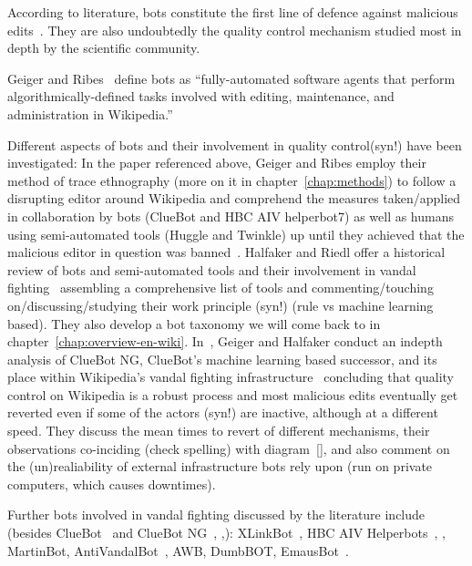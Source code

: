 According to literature, bots constitute the first line of defence against malicious edits~\cite{GeiHal2013}. %
They are also undoubtedly the quality control mechanism studied most in depth by the scientific community.

Geiger and Ribes~\cite{GeiRib2010} define bots as
``fully-automated software
agents that perform algorithmically-defined tasks involved
with editing, maintenance, and administration in Wikipedia.''

Different aspects of bots and their involvement in quality control(syn!) have been investigated:
In the paper referenced above, Geiger and Ribes employ their method of trace ethnography (more on it in chapter~\ref{chap:methods}) to follow a disrupting editor around Wikipedia and comprehend the measures taken/applied in collaboration by bots (ClueBot and HBC AIV helperbot7) as well as humans using semi-automated tools (Huggle and Twinkle) up until they achieved that the malicious editor in question was banned~\cite{GeiRib2010}.
Halfaker and Riedl offer a historical review of bots and semi-automated tools and their involvement in vandal fighting~\cite{HalRied2012} assembling a comprehensive list of tools and commenting/touching on/discussing/studying their work principle (syn!) (rule vs machine learning based).
They also develop a bot taxonomy we will come back to in chapter~\ref{chap:overview-en-wiki}. %
In~\cite{GeiHal2013}, Geiger and Halfaker conduct an indepth analysis of ClueBot NG, ClueBot's machine learning based successor, and its place within Wikipedia's vandal fighting infrastructure~\cite{GeiHal2013} concluding that quality control on Wikipedia is a robust process and most malicious edits eventually get reverted even if some of the actors (syn!) are inactive, although at a different speed.
They discuss the mean times to revert of different mechanisms, their observations co-inciding (check spelling) with diagram~\ref{},
and also comment on the (un)realiability of external infrastructure bots rely upon (run on private computers, which causes downtimes).

Further bots involved in vandal fighting discussed by the literature include (besides ClueBot~\cite{GeiRib2010} and ClueBot NG~\cite{GeiHal2013}, \cite{HalRied2012},):
XLinkBot~\cite{HalRied2012},
HBC AIV Helperbots~\cite{HalRied2012}, \cite{GeiRib2010},
MartinBot, AntiVandalBot~\cite{HalRied2012},
AWB, DumbBOT, EmausBot~\cite{GeiHal2013}.

